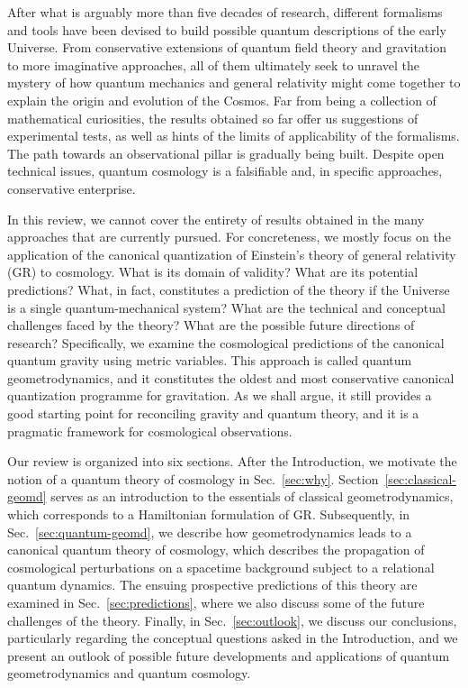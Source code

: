 \documentclass[12pt]{iopart}
\begin{document}
After what is arguably more than five decades of research, different formalisms and tools have been devised to build possible quantum descriptions of the early Universe. From conservative extensions of quantum field theory and gravitation to more imaginative approaches, all of them ultimately seek to unravel the mystery of how quantum mechanics and general relativity might come together to explain the origin and evolution of the Cosmos. Far from being a collection of mathematical curiosities, the results obtained so far offer us suggestions of experimental tests, as well as hints of the limits of applicability of the formalisms. The path towards an observational pillar is gradually being built. Despite open technical issues, quantum cosmology is a falsifiable and, in specific approaches, conservative enterprise.

In this review, we cannot cover the entirety of results obtained in the many approaches that are currently pursued. For concreteness, we mostly focus on the application of the canonical quantization of Einstein's theory of general relativity (GR) to cosmology. What is its domain of validity? What are its potential predictions? What, in fact, constitutes a prediction of the theory if the Universe is a single quantum-mechanical system? What are the technical and conceptual challenges faced by the theory? What are the possible future directions of research? Specifically, we examine the cosmological predictions of the canonical quantum gravity using metric variables. This approach is called quantum geometrodynamics, and it constitutes the oldest and most conservative canonical quantization programme for gravitation. As we shall argue, it still provides a good starting point for reconciling gravity and quantum theory, and it is a pragmatic framework for cosmological observations.

Our review is organized into six sections. After the Introduction, we motivate the notion of a quantum theory of cosmology in Sec.~\ref{sec:why}. Section~\ref{sec:classical-geomd} serves as an introduction to the essentials of classical geometrodynamics, which corresponds to a Hamiltonian formulation of GR. Subsequently, in Sec.~\ref{sec:quantum-geomd}, we describe how geometrodynamics leads to a canonical quantum theory of cosmology, which describes the propagation of cosmological perturbations on a spacetime background subject to a relational quantum dynamics. The ensuing prospective predictions of this theory are examined in Sec.~\ref{sec:predictions}, where we also discuss some of the future challenges of the theory. Finally, in Sec.~\ref{sec:outlook}, we discuss our conclusions, particularly regarding the conceptual questions asked in the Introduction, and we present an outlook of possible future developments and applications of quantum geometrodynamics and quantum cosmology.
 
\end{document}
